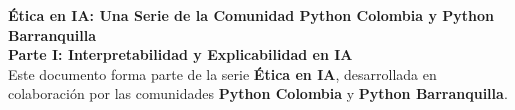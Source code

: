 \begin{titlepage}

\begin{center}

{\makeatletter
\largetitlestyle\fontsize{45}{45}\selectfont\@title
\makeatother}

{\makeatletter
\ifdefvoid{\@subtitle}{}{\bigskip\titlestyle\fontsize{16}{14}\selectfont\@subtitle}
\makeatother}

\bigskip
\bigskip


\bigskip
\bigskip

{\makeatletter
\largetitlestyle\fontsize{25}{25}\selectfont\@author
\makeatother}

\bigskip
\bigskip

%
%

\vfill

\vspace*{\fill} %
\begin{center}
    {\Huge \textbf{Ética en IA: Una Serie de la Comunidad Python Colombia y Python Barranquilla}} \\[15pt]
    {\Large \textbf{Parte I: Interpretabilidad y Explicabilidad en IA}} \\[30pt]
    
    {\large Este documento forma parte de la serie \textbf{Ética en IA}, desarrollada en colaboración por las comunidades \textbf{Python Colombia} y \textbf{Python Barranquilla}.} \\[15pt]
    

\end{center}
\end{center}
\end{titlepage}
